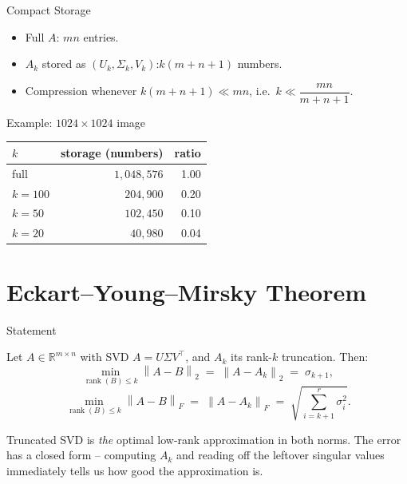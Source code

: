 \documentclass[10pt,aspectratio=169]{beamer}
\DeclareMathOperator{\rank}{rank}
\newcommand{\R}{\mathbb{R}}
\newcommand{\norm}[1]{\left\|#1\right\|}
\begin{document}
\begin{frame}{Compact Storage}
  \begin{itemize}
    \item Full $A$: $mn$ entries.
    \item $A_k$ stored as $(U_k, \Sigma_k, V_k)$:\quad $k(m + n + 1)$ numbers.
    \item Compression whenever $k(m+n+1) \ll mn$, i.e.\ $k \ll \dfrac{mn}{m+n+1}$.
  \end{itemize}

  \begin{block}{Example: $1024 \times 1024$ image}
    \begin{tabular}{lrr}
      \toprule
      $k$ & storage (numbers) & ratio \\
      \midrule
      full     & $1{,}048{,}576$ & 1.00 \\
      $k=100$  & $204{,}900$     & 0.20 \\
      $k=50$   & $102{,}450$     & 0.10 \\
      $k=20$   & $40{,}980$      & 0.04 \\
      \bottomrule
    \end{tabular}
  \end{block}
\end{frame}

\section{Eckart--Young--Mirsky Theorem}

\begin{frame}{Statement}
  \begin{theorem}
    Let $A \in \R^{m\times n}$ with SVD $A = U\Sigma V^\top$, and $A_k$ its rank-$k$ truncation. Then:
    \[
      \min_{\rank(B) \leq k} \norm{A-B}_2 \;=\; \norm{A-A_k}_2 \;=\; \sigma_{k+1},
    \]
    \[
      \min_{\rank(B) \leq k} \norm{A-B}_F \;=\; \norm{A-A_k}_F \;=\; \sqrt{\sum_{i=k+1}^{r} \sigma_i^2}.
    \]
  \end{theorem}
  Truncated SVD is \emph{the} optimal low-rank approximation in both norms. The error has a closed form -- computing $A_k$ and reading off the leftover singular values immediately tells us how good the approximation is.
\end{frame}
\end{document}
